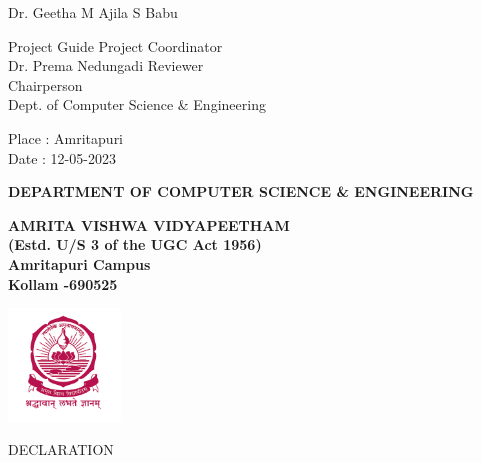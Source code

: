 \documentclass[oneside,12pt]{Classes/CUEDthesisPSnPDF}
\begin{document}



\vspace{20pt}

\begin{flushleft}
	\vspace{5pt}
	Dr. Geetha M \hspace{242pt} Ajila S Babu\\

	\vspace{3pt}

	Project Guide \hspace{230pt} Project Coordinator\\[10ex]



	Dr. Prema Nedungadi  \hspace{240pt} Reviewer\\  Chairperson\\ Dept. of Computer Science \& Engineering \\[8ex]




\end{flushleft}

\begin{flushleft}

	\vspace{5pt}

	Place	:	Amritapuri \\
	Date	: 12-05-2023

\end{flushleft}



\pagebreak


\begin{center}

	{\normalsize {\bfseries{DEPARTMENT OF COMPUTER SCIENCE \& ENGINEERING\\[1ex]}}}


	{\normalsize {\bfseries{AMRITA VISHWA VIDYAPEETHAM\\ (Estd. U/S 3 of the UGC Act 1956)\\ [1ex]Amritapuri  Campus \\[1ex] Kollam -690525\\[1ex]}}}

	\includegraphics[width=30mm]{UNIVEMBLEM.png}


	\rmfamily\bfseries\upshape\Large

	DECLARATION \\[2ex]


\end{center}
\end{document}
